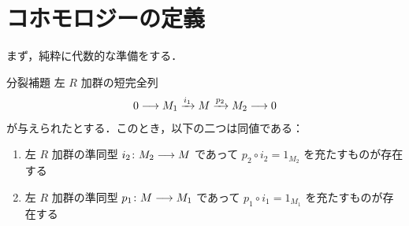 \documentclass[algtopo_main]{subfiles}
\begin{document}
\setcounter{chapter}{2}


\chapter{コホモロジーの定義}

まず，純粋に代数的な準備をする．

\begin{mylem}[label=lem:splitting]{分裂補題}
    左 $R$ 加群の短完全列
    \begin{align}
        \label{SES:3-1}
        0 \longrightarrow M_1 \xrightarrow{i_1} M \xrightarrow{p_2} M_2 \longrightarrow 0
    \end{align}
    が与えられたとする．このとき，以下の二つは同値である：
    \begin{enumerate}
        \item 左 $R$ 加群の準同型 $i_2 \colon M_2 \longrightarrow M$ であって $p_2 \circ i_2 = 1_{M_2}$ を充たすものが存在する
        \item 左 $R$ 加群の準同型 $p_1 \colon M \longrightarrow M_1$ であって $p_1 \circ i_1 = 1_{M_1}$ を充たすものが存在する
    \end{enumerate}
\end{mylem}
\end{document}
